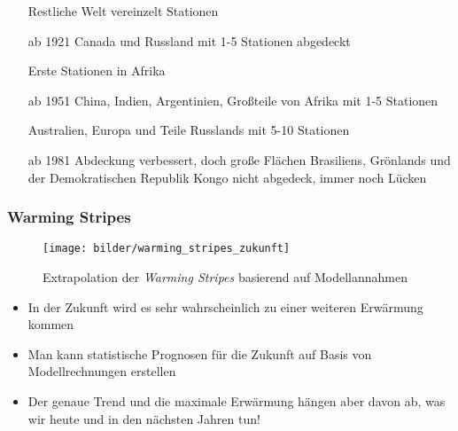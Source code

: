 \begin{frame}[t]
{\begin{itemize}
		\item[] Restliche Welt vereinzelt Stationen
		\item[ab 1921] Canada und Russland mit 1-5 Stationen abgedeckt
		\item[] Erste Stationen in Afrika
		\item[ab 1951] China, Indien, Argentinien, Großteile von Afrika mit 1-5 Stationen
		\item[] Australien, Europa und Teile Russlands mit 5-10 Stationen
		\item[ab 1981] Abdeckung verbessert, doch große Flächen Brasiliens, Grönlands und der Demokratischen Republik Kongo nicht abgedeck, immer noch Lücken
	\end{itemize}
	}
\end{frame}

\begin{frame}
	\frametitle{Warming Stripes}
	\begin{figure}
		\centering
		\texttt{[image: bilder/warming\_stripes\_zukunft]}
		\caption{Extrapolation der \textit{Warming Stripes} basierend auf Modellannahmen}
	\end{figure}
	\begin{itemize}
		\item In der Zukunft wird es sehr wahrscheinlich zu einer weiteren Erwärmung kommen
		\item Man kann statistische Prognosen für die Zukunft auf Basis von Modellrechnungen erstellen
		\item Der genaue Trend und die maximale Erwärmung hängen aber davon ab, was wir heute und in den nächsten Jahren tun!
	\end{itemize}

\end{frame}
